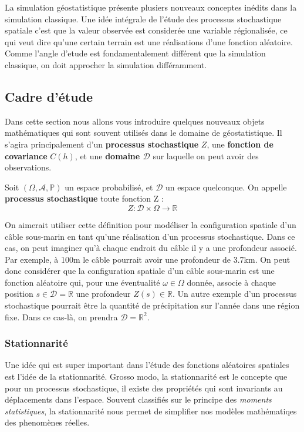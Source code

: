 \documentclass[10pt]{article} %
\begin{document}
La simulation géostatistique présente plusiers nouveaux conceptes inédits dans la simulation classique. Une idée intégrale de l'étude des processus
stochastique spatiale c'est que la valeur observée est considerée une variable régionalisée, ce qui veut dire qu'une certain terrain
est une réalisations d'une fonction aléatoire. Comme l'angle d'etude est fondamentalement différent que la simulation classique, on doit approcher la simulation
différamment.

\subsection{Cadre d'étude}
Dans cette section nous allons vous introduire quelques nouveaux objets mathématiques qui sont souvent utilisés dans le domaine
de géostatistique. Il s'agira principalement d'un \textbf{processus stochastique} $Z$, une \textbf{fonction de covariance} $C(h)$, et une \textbf{domaine $\mathcal{D}$} sur laquelle
on peut avoir des observations.

\begin{definition}
    Soit $(\Omega, \mathcal{A}, \mathbb{P})$ un espace probabilisé, et $\mathcal{D}$ un espace quelconque. On appelle
    \textbf{processus stochastique} toute fonction Z :
    $$ Z : \mathcal{D} \times \Omega \to \mathbb{R} $$
\end{definition}

On aimerait utiliser cette définition pour modéliser la configuration spatiale d'un câble sous-marin en tant qu'une réalisation d'un processus stochastique.
Dans ce cas, on peut imaginer qu'à chaque endroit du câble il y a une profondeur associé. Par exemple, à 100m le câble pourrait avoir une profondeur de 3.7km. On peut donc
considérer que la configuration spatiale d'un câble sous-marin est une fonction aléatoire qui, pour une éventualité $\omega \in \Omega$ donnée, associe à chaque position
$s \in \mathcal{D} = \mathbb{R}$ une profondeur $Z(s) \in \mathbb{R}$. Un autre exemple d'un processus stochastique pourrait être la quantité de précipitation sur l'année dans une région fixe. Dans ce cas-là, on prendra $\mathcal{D} = \mathbb{R}^2$.

\subsubsection{Stationnarité}

Une idée qui est super important dans l'étude des fonctions aléatoires spatiales est l'idée de la stationnarité. Grosso modo, la stationnarité est le concepte que pour un processus stochastique,
il existe des propriétés qui sont invariants au déplacements dans l'espace. Souvent classifiés sur le principe des \textit{moments statistiques}, la stationnarité nous permet de simplifier nos modèles mathématiqes des
phenomènes réelles.
\end{document}

